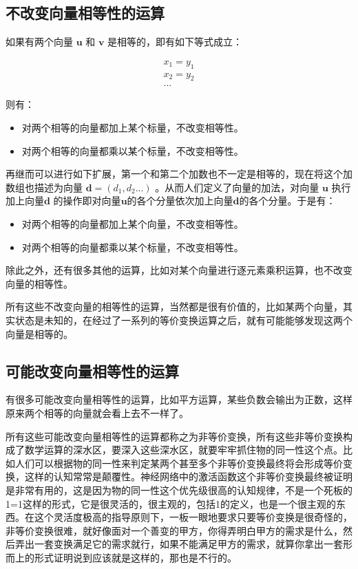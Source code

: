\documentclass[12pt,oneside]{book}
\begin{document}
\subsection{不改变向量相等性的运算}
如果有两个向量 $\boldsymbol{u}$ 和 $\boldsymbol{v}$ 是相等的，即有如下等式成立：

\begin{align*}
x_1 = y_1\\
x_2 = y_2\\
...
\end{align*}

则有：

\begin{itemize}
\item 对两个相等的向量都加上某个标量，不改变相等性。
\item 对两个相等的向量都乘以某个标量，不改变相等性。
\end{itemize}

再继而可以进行如下扩展，第一个和第二个加数也不一定是相等的，现在将这个加数组也描述为向量 $\boldsymbol{d} = (d_1, d_2 ...)$ 。从而人们定义了向量的加法，对向量 $\boldsymbol{u}$ 执行加上向量$\boldsymbol{d}$ 的操作即对向量$\boldsymbol{u}$的各个分量依次加上向量$\boldsymbol{d}$的各个分量。于是有：


\begin{itemize}
\item 对两个相等的向量都加上某个向量，不改变相等性。
\item 对两个相等的向量都乘以某个标量，不改变相等性。
\end{itemize}

除此之外，还有很多其他的运算，比如对某个向量进行逐元素乘积运算，也不改变向量的相等性。

所有这些不改变向量的相等性的运算，当然都是很有价值的，比如某两个向量，其实状态是未知的，在经过了一系列的等价变换运算之后，就有可能能够发现这两个向量是相等的。


\subsection{可能改变向量相等性的运算}
有很多可能改变向量相等性的运算，比如平方运算，某些负数会输出为正数，这样原来两个相等的向量就会看上去不一样了。

所有这些可能改变向量相等性的运算都称之为非等价变换，所有这些非等价变换构成了数学运算的深水区，要深入这些深水区，就要牢牢抓住物的同一性这个点。比如人们可以根据物的同一性来判定某两个甚至多个非等价变换最终将会形成等价变换，这样的认知常常是颠覆性。神经网络中的激活函数这个非等价变换最终被证明是非常有用的，这是因为物的同一性这个优先级很高的认知规律，不是一个死板的1=1这样的形式，它是很灵活的，很主观的，包括1的定义，也是一个很主观的东西。在这个灵活度极高的指导原则下，一板一眼地要求只要等价变换是很奇怪的，非等价变换很难，就好像面对一个善变的甲方，你得弄明白甲方的需求是什么，然后弄出一套变换满足它的需求就行，如果不能满足甲方的需求，就算你拿出一套形而上的形式证明说到应该就是这样的，那也是不行的。
\end{document}
